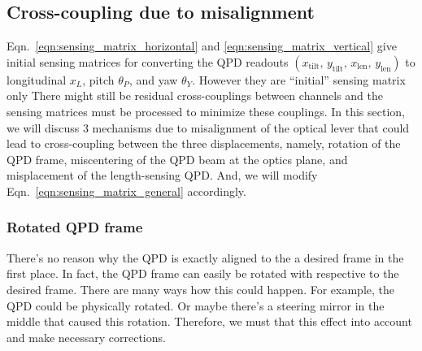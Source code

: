 \subsection{Cross-coupling due to misalignment\label{sec:misalignment}}
Eqn.~\eqref{eqn:sensing_matrix_horizontal} and \eqref{eqn:sensing_matrix_vertical} give initial sensing matrices for converting the QPD readouts $\left(x_\mathrm{tilt},\,y_\mathrm{tilt},\,x_\mathrm{len},\,y_\mathrm{len}\right)$ to longitudinal $x_L$, pitch $\theta_P$, and yaw $\theta_Y$.
However they are ``initial'' sensing matrix only
There might still be residual cross-couplings between channels and the sensing matrices must be processed to minimize these couplings.
In this section, we will discuss 3 mechanisms due to misalignment of the optical lever that could lead to cross-coupling between the three displacements, namely, rotation of the QPD frame, miscentering of the QPD beam at the optics plane, and misplacement of the length-sensing QPD.
And, we will modify Eqn.~\eqref{eqn:sensing_matrix_general} accordingly.

\subsubsection{Rotated QPD frame}
There's no reason why the QPD is exactly aligned to the a desired frame in the first place.
In fact, the QPD frame can easily be rotated with respective to the desired frame.
There are many ways how this could happen.
For example, the QPD could be physically rotated.
Or maybe there's a steering mirror in the middle that caused this rotation.
Therefore, we must that this effect into account and make necessary corrections.

